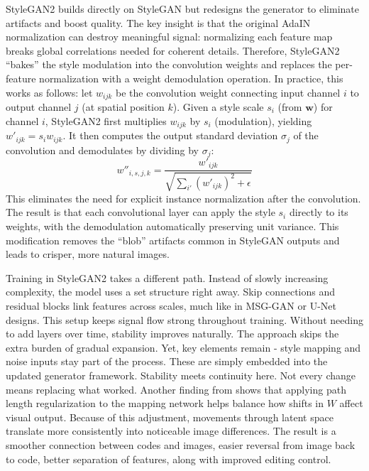 StyleGAN2 \citet{karras2020analyzingimprovingimagequality} builds directly on StyleGAN but redesigns the generator to eliminate artifacts and boost quality.
The key insight is that the original AdaIN normalization can destroy meaningful signal: normalizing each feature map breaks global correlations needed for coherent details.
Therefore, StyleGAN2 “bakes” the style modulation into the convolution weights and replaces the per-feature normalization with a weight demodulation operation.
In practice, this works as follows: let $w_{ijk}$ be the convolution weight connecting input channel $i$ to output channel $j$ (at spatial position $k$).
Given a style scale $s_i$ (from $\mathbf{w}$) for channel $i$, StyleGAN2 first multiplies $w_{ijk}$ by $s_i$ (modulation), yielding $w'_{ijk}=s_i w_{ijk}$.
It then computes the output standard deviation $\sigma_j$ of the convolution and demodulates by dividing by $\sigma_j$:
\begin{equation}
w''_{i,s,j,k} = \frac{w'_{ijk}}{\sqrt{\sum_{i'} (w'_{ijk})^2 + \epsilon}}
\label{eq:stylegan2_demod}
\end{equation}
This eliminates the need for explicit instance normalization after the convolution. 
The result is that each convolutional layer can apply the style $s_i$ directly to its weights, 
with the demodulation automatically preserving unit variance. This modification removes the “blob” artifacts common in StyleGAN outputs and leads to crisper, more natural images.

Training in StyleGAN2 takes a different path. Instead of slowly increasing complexity, the model uses a set structure right away. Skip connections and residual blocks link features across scales, much like in MSG-GAN or U-Net designs. This setup keeps signal flow strong throughout training. Without needing to add layers over time, stability improves naturally. The approach skips the extra burden of gradual expansion. Yet, key elements remain - style mapping and noise inputs stay part of the process. These are simply embedded into the updated generator framework. Stability meets continuity here. Not every change means replacing what worked. Another finding from \citet{karras2020analyzingimprovingimagequality} shows that applying path length regularization to the mapping network helps balance how shifts in $W$ affect visual output. Because of this adjustment, movements through latent space translate more consistently into noticeable image differences. The result is a smoother connection between codes and images, easier reversal from image back to code, better separation of features, along with improved editing control.

